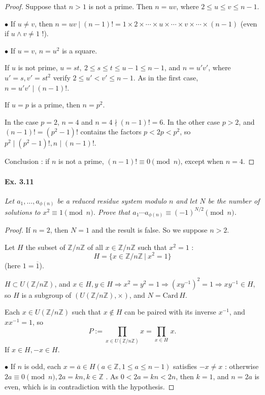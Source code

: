 \documentclass[11pt,a4paper]{article}
\newcommand{\Z}{\mathbb{Z}}
\begin{document}
{\begin{proof}
Suppose that $n >1$ is not a prime. Then $n = uv$, where $2 \leq u \leq v \leq n-1$.

$\bullet$ If $u \neq v$, then $n = uv \mid (n-1)! = 1\times 2 \times\cdots \times u \times\cdots \times v \times \cdots \times (n-1)$ (even if $u\wedge v \neq 1$ !).

$\bullet$ If $u=v$, $n = u^2$ is a square.

If $u$ is not prime, $u =st,\ 2\leq s \leq t \leq u-1 \leq n-1$, and $n = u' v'$, where $u' =s,v' =st^2$ verify  $2 \leq u' < v' \leq n-1$. As in the first case, $n = u'v' \mid (n-1)!$.  

If $u = p$ is a prime, then $n =p^2$.

In the case $p = 2$, $n = 4$ and $n=4  \nmid (n-1)! = 6$. In the other case $p >2$, and $(n-1)! = (p^2 - 1)!$ contains the factors $p < 2p < p^2$, so $p^2 \mid (p^2-1)!, n \mid (n-1)!$.

Conclusion : if $n$ is not a prime, $(n - 1)! \equiv 0 \pmod n$, except when $n=4$.

\end{proof}

\paragraph{Ex. 3.11}

{\it Let $a_1, \ldots, a_{\phi(n)}$ be a reduced residue system modulo $n$ and let $N$ be the number of solutions to $x^2 \equiv 1 \pmod n$. Prove that $a_1 \cdots a_{\phi(n)} \equiv (-1)^{N/2} \pmod n$.
}

\begin{proof}
If $n=2$, then $N=1$ and the result is false. So we suppose $n>2$.

Let $H$ the subset of $\Z/n\Z$ of all $x \in \Z/n\Z$ such that $x^2=1$ :
$$H = \{x \in \Z/n\Z\ \vert \ x^2 = 1\}$$
(here $1 = \overline{1}$).

$H \subset U(\Z/n\Z)$, and $x \in H, y \in H \Rightarrow x^2 = y^2=1 \Rightarrow (xy^{-1})^2 = 1 \Rightarrow xy^{-1} \in H$, so $H$ is a subgroup of $(U(\Z/n\Z),\times)$, and $N = \mathrm{Card}\, H$.

Each $x \in U(\Z/n\Z)$ such that $x \not \in H$ can be paired with its inverse $x^{-1}$, and $xx^{-1} = 1$, so
$$P := \prod_{x \in U(\Z/n\Z)} x = \prod_{x\in H} \, x.$$
If $x \in H, -x \in H$.

$\bullet$ If $n$ is odd, each $x = \overline{a}\in H (a\in \Z, 1\leq a \leq n-1)$ satisfies $-x \neq x$ : otherwise $2 a \equiv 0 \pmod n, 2a = k n, k \in \Z$ . As $0<2a = kn  < 2n$, then $k=1$, and $n = 2a$ is even, which is in contradiction with the hypothesis.


\end{proof}}
\end{document}
